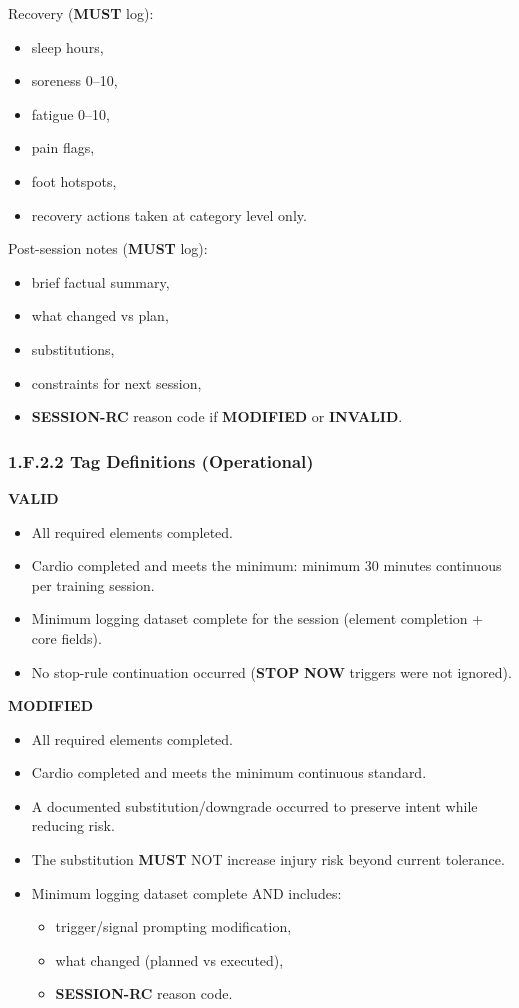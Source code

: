 \documentclass[10pt]{article}
\begin{document}
Recovery (\textbf{MUST} log):

\begin{itemize}
\item sleep hours,
\item soreness 0–10,
\item fatigue 0–10,
\item pain flags,
\item foot hotspots,
\item recovery actions taken at category level only.
\end{itemize}

Post-session notes (\textbf{MUST} log):

\begin{itemize}
\item brief factual summary,
\item what changed vs plan,
\item substitutions,
\item constraints for next session,
\item \textbf{SESSION-RC} reason code if \textbf{MODIFIED} or \textbf{INVALID}.
\end{itemize}

\subsubsection*{1.F.2.2 Tag Definitions (Operational)}

\textbf{VALID}

\begin{itemize}
\item All required elements completed.
\item Cardio completed and meets the minimum: minimum 30 minutes continuous per training session.
\item Minimum logging dataset complete for the session (element completion + core fields).
\item No stop-rule continuation occurred (\textbf{STOP} \textbf{NOW} triggers were not ignored).
\end{itemize}

\textbf{MODIFIED}

\begin{itemize}
\item All required elements completed.
\item Cardio completed and meets the minimum continuous standard.
\item A documented substitution/downgrade occurred to preserve intent while reducing risk.
\item The substitution \textbf{MUST} NOT increase injury risk beyond current tolerance.
\item Minimum logging dataset complete AND includes:
\begin{itemize}
\item trigger/signal prompting modification,
\item what changed (planned vs executed),
\item \textbf{SESSION-RC} reason code.
\end{itemize}
\end{itemize}
\end{document}
